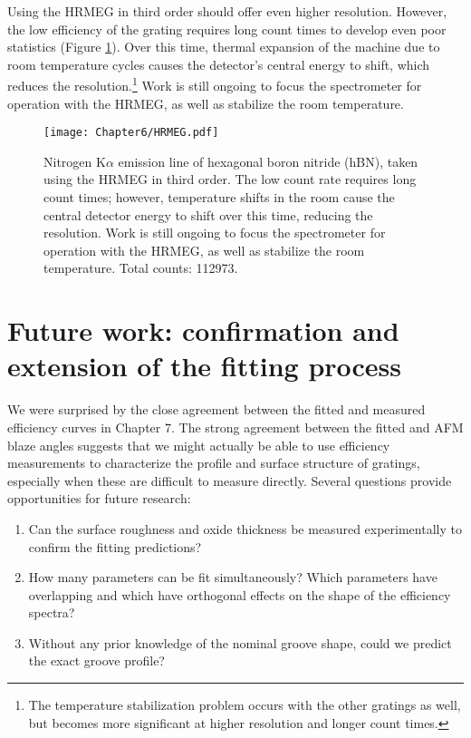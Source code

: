 Using the HRMEG in third order should offer even higher resolution.  However, the low efficiency of the grating requires long count times to develop even poor statistics (Figure \ref{hrmegXES}).  Over this time, thermal expansion of the machine due to room temperature cycles causes the detector's central energy to shift, which reduces the resolution.\footnote{The temperature stabilization problem occurs with the other gratings as well, but becomes more significant at higher resolution and longer count times.} Work is still ongoing to focus the spectrometer for operation with the HRMEG, as well as stabilize the room temperature.

\begin{figure}[htbp] %
   \centering
   \texttt{[image: Chapter6/HRMEG.pdf]} 
   \caption{Nitrogen K$\alpha$ emission line of hexagonal boron nitride (hBN), taken using the HRMEG in third order.  The low count rate requires long count times; however, temperature shifts in the room cause the central detector energy to shift over this time, reducing the resolution.  Work is still ongoing to focus the spectrometer for operation with the HRMEG, as well as stabilize the room temperature.    Total counts: 112973.}
   \label{hrmegXES}
\end{figure}

\section{Future work: confirmation and extension of the fitting process}
We were surprised by the close agreement between the fitted and measured efficiency curves in Chapter 7.  The strong agreement between the fitted and AFM blaze angles suggests that we might actually be able to use efficiency measurements to characterize the profile and surface structure of gratings, especially when these are difficult to measure directly.  Several questions provide opportunities for future research:
\begin{enumerate}
\item Can the surface roughness and oxide thickness be measured experimentally to confirm the fitting predictions?
\item How many parameters can be fit simultaneously? Which parameters have overlapping and which have orthogonal effects on the shape of the efficiency spectra?
\item Without any prior knowledge of the nominal groove shape, could we predict the exact groove profile?
\end{enumerate}

